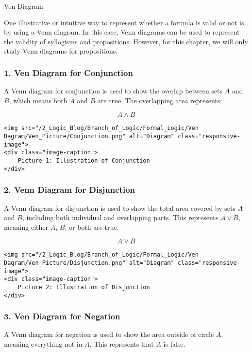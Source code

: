Ven Diagram

One illustrative or intuitive way to represent whether a formula is
valid or not is by using a Venn diagram. In this case, Venn diagrams can
be used to represent the validity of syllogisms and propositions.
However, for this chapter, we will only study Venn diagrams for
propositions.

\subsubsection{1. Ven Diagram for
Conjunction}\label{ven-diagram-for-conjunction}

A Venn diagram for conjunction is used to show the overlap between sets
\(A\) and \(B\), which means both \(A\) and \(B\) are true. The
overlapping area represents:

\[
A \wedge B
\]

\begin{verbatim}
<img src="/2_Logic_Blog/Branch_of_Logic/Formal_Logic/Ven Dagram/Ven_Picture/Conjunction.png" alt="Diagram" class="responsive-image">
<div class="image-caption">
    Picture 1: Illustration of Conjunction
</div>
\end{verbatim}

\subsubsection{2. Venn Diagram for
Disjunction}\label{venn-diagram-for-disjunction}

A Venn diagram for disjunction is used to show the total area covered by
sets \(A\) and \(B\), including both individual and overlapping parts.
This represents \(A \vee B\), meaning either \(A\), \(B\), or both are
true.

\[
A \vee B
\]

\begin{verbatim}
<img src="/2_Logic_Blog/Branch_of_Logic/Formal_Logic/Ven Dagram/Ven_Picture/Disjunction.png" alt="Diagram" class="responsive-image">
<div class="image-caption">
    Picture 2: Illustration of Disjunction
</div>
\end{verbatim}

\subsubsection{3. Ven Diagram for
Negation}\label{ven-diagram-for-negation}

A Venn diagram for negation is used to show the area outside of circle
\(A\), meaning everything not in \(A\). This represents that \(A\) is
false.

